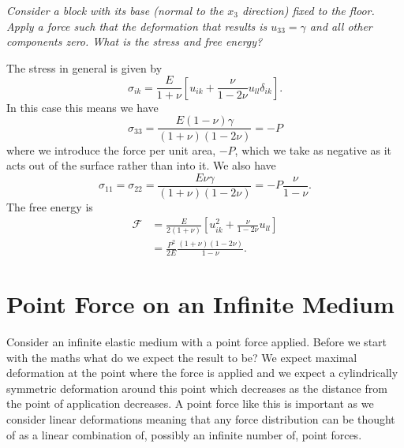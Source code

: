 \documentclass[a4paper]{article}
\newcommand{\freeEnergy}{\mathcal{F}}
\begin{document}
    \begin{example}
        \itshape
        Consider a block with its base (normal to the \(x_3\) direction) fixed to the floor.
        Apply a force such that the deformation that results is \(u_{33} = \gamma\) and all other components zero.
        What is the stress and free energy?
        
        \normalfont
        The stress in general is given by
        \[\sigma_{ik} = \frac{E}{1 + \nu}\left[ u_{ik} + \frac{\nu}{1 - 2\nu}u_{ll}\delta_{ik} \right].\]
        In this case this means we have
        \[\sigma_{33} = \frac{E(1 - \nu)\gamma}{(1 + \nu)(1 - 2\nu)} = -P\]
        where we introduce the force per unit area, \(-P\), which we take as negative as it acts out of the surface rather than into it.
        We also have
        \[\sigma_{11} = \sigma_{22} = \frac{E\nu \gamma}{(1 + \nu)(1 - 2\nu)} = -P\frac{\nu}{1 - \nu}.\]
        The free energy is
        \begin{align*}
            \freeEnergy &= \frac{E}{2(1 + \nu)}\left[ u_{ik}^2 + \frac{\nu}{1 - 2\nu}u_{ll} \right]\\
            &= \frac{P^2}{2E}\frac{(1 + \nu)(1 - 2\nu)}{1 - \nu}.
        \end{align*}
    \end{example}
    \section{Point Force on an Infinite Medium}\label{sec:point force elasticity}
    Consider an infinite elastic medium with a point force applied.
    Before we start with the maths what do we expect the result to be?
    We expect maximal deformation at the point where the force is applied and we expect a cylindrically symmetric deformation around this point which decreases as the distance from the point of application decreases.
    A point force like this is important as we consider linear deformations meaning that any force distribution can be thought of as a linear combination of, possibly an infinite number of, point forces.
    
\end{document}

